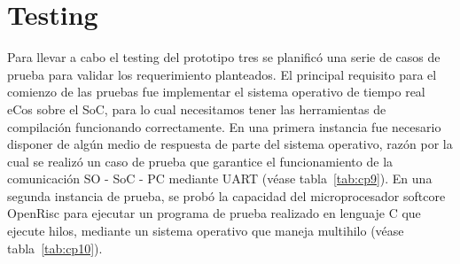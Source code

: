 		
\newpage
		\section{Testing}

Para llevar a cabo el testing del prototipo tres se planificó una serie de casos de prueba para validar los requerimiento planteados.
El principal requisito para el comienzo de las pruebas fue implementar el sistema operativo de tiempo real eCos sobre el SoC, para lo cual necesitamos tener las herramientas de compilación funcionando correctamente. En una primera
instancia fue necesario disponer de algún medio de respuesta de parte del sistema operativo, razón por la cual se realizó un caso de prueba que garantice el funcionamiento  de la comunicación SO - SoC - PC mediante UART (véase tabla~\ref{tab:cp9}). En una segunda instancia de prueba, se probó la capacidad del microprocesador softcore OpenRisc para ejecutar un programa de prueba realizado en lenguaje C que ejecute hilos, mediante un sistema operativo que maneja multihilo (véase tabla~\ref{tab:cp10}).

